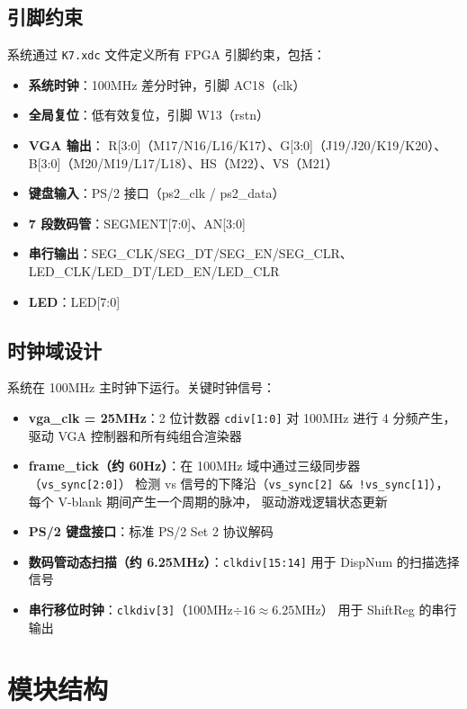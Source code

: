 \documentclass[12pt,a4paper]{ctexart}
\begin{document}
\subsection{引脚约束}

系统通过 \texttt{K7.xdc} 文件定义所有 FPGA 引脚约束，包括：
\begin{itemize}
    \item \textbf{系统时钟}：100MHz 差分时钟，引脚 AC18（clk）
    \item \textbf{全局复位}：低有效复位，引脚 W13（rstn）
    \item \textbf{VGA 输出}：
    R[3:0]（M17/N16/L16/K17）、G[3:0]（J19/J20/K19/K20）、B[3:0]（M20/M19/L17/L18）、HS（M22）、VS（M21）
    \item \textbf{键盘输入}：PS/2 接口（ps2\_clk / ps2\_data）
    \item \textbf{7 段数码管}：SEGMENT[7:0]、AN[3:0]
    \item \textbf{串行输出}：SEG\_CLK/SEG\_DT/SEG\_EN/SEG\_CLR、LED\_CLK/LED\_DT/LED\_EN/LED\_CLR
    \item \textbf{LED}：LED[7:0]
\end{itemize}

\subsection{时钟域设计}

系统在 100MHz 主时钟下运行。关键时钟信号：

\begin{itemize}
    \item \textbf{vga\_clk = 25MHz}：2 位计数器 \texttt{cdiv[1:0]} 对 100MHz 进行 4 分频产生，
    驱动 VGA 控制器和所有纯组合渲染器
    \item \textbf{frame\_tick（约 60Hz）}：在 100MHz 域中通过三级同步器（\texttt{vs\_sync[2:0]}）
    检测 vs 信号的下降沿（\texttt{vs\_sync[2] \&\& !vs\_sync[1]}），每个 V-blank 期间产生一个周期的脉冲，
    驱动游戏逻辑状态更新
    \item \textbf{PS/2 键盘接口}：标准 PS/2 Set 2 协议解码
    \item \textbf{数码管动态扫描（约 6.25MHz）}：\texttt{clkdiv[15:14]} 用于 DispNum 的扫描选择信号
    \item \textbf{串行移位时钟}：\texttt{clkdiv[3]}（100MHz$\div 16 \approx 6.25$MHz）
    用于 ShiftReg 的串行输出
\end{itemize}


\section{模块结构}
\end{document}
